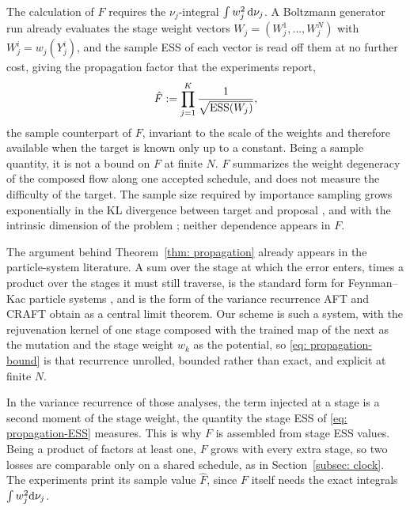 \documentclass{article}
\begin{document}
The calculation of $F$ requires the $\nu_j$-integral $\int w_j^2 \, \mathrm{d}\nu_j$. A Boltzmann generator run already evaluates the stage weight vectors $W_j = (W_j^1,\dots,W_j^N)$ with $W_j^i = w_j(Y_j^i)$, and the sample ESS of each vector is read off them at no further cost, giving the propagation factor that the experiments report,
\begin{equation}
    \hat F := \prod_{j=1}^{K} \frac{1}{\sqrt{\mathrm{ESS}(W_j)}} ,
    \label{eq: propagation-factor-hat}
\end{equation}
the sample counterpart of $F$, invariant to the scale of the weights and therefore available when the target is known only up to a constant. Being a sample quantity, it is not a bound on $F$ at finite $N$.
$F$ summarizes the weight degeneracy of the composed flow along one accepted schedule, and does not measure the difficulty of the target. The sample size required by importance sampling grows exponentially in the KL divergence between target and proposal \citep{chatterjee2018sample}, and with the intrinsic dimension of the problem \citep{agapiou2017importance}; neither dependence appears in $F$.

The argument behind Theorem~\ref{thm: propagation} already appears in the particle-system literature. A sum over the stage at which the error enters, times a product over the stages it must still traverse, is the standard form for Feynman--Kac particle systems \citep{delmoral2004feynman,chopin2020introduction}, and is the form of the variance recurrence AFT \citep{arbel2021annealed} and CRAFT \citep{matthews2022craft} obtain as a central limit theorem. Our scheme is such a system, with the rejuvenation kernel of one stage composed with the trained map of the next as the mutation and the stage weight $w_k$ as the potential, so \eqref{eq: propagation-bound} is that recurrence unrolled, bounded rather than exact, and explicit at finite $N$.

In the variance recurrence of those analyses, the term injected at a stage is a second moment of the stage weight, the quantity the stage ESS of \eqref{eq: propagation-ESS} measures. This is why $F$ is assembled from stage ESS values. Being a product of factors at least one, $F$ grows with every extra stage, so two losses are comparable only on a shared schedule, as in Section~\ref{subsec: clock}. The experiments print its sample value $\hat F$, since $F$ itself needs the exact integrals $\int w_j^2\mathrm{d}\nu_j$.

\end{document}

